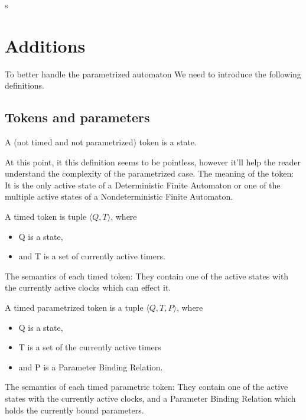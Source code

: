 s\chapter{Additions}
\label{chap:additions}


To better handle the parametrized automaton We need to introduce the following definitions.

\section{Tokens and parameters}

\begin{dfn}
	\label{token}
	A (not timed and not parametrized) token is a state.
\end{dfn}

At this point, it this definition seems to be pointless, however it'll help the reader understand the complexity of the parametrized case.
The meaning of the token: It is the only active state of a Deterministic Finite Automaton or one of the multiple active states of a Nondeterministic Finite Automaton.

\begin{dfn}
	\label{timed_token}
	A timed token is tuple $\langle Q, T\rangle$, where
	\begin{itemize}
		\item Q is a state,
		\item and T is a set of currently active timers.
	\end{itemize} 
\end{dfn}

The semantics of each timed token: They contain one of the active states with the currently active clocks which can effect it.

\begin{dfn}
	\label{timed_parametrized_token}
	A timed parametrized token is a tuple $\langle Q, T, P \rangle$, where
	\begin{itemize}
		\item Q is a state,
		\item T is a set of the currently active timers
		\item and P is a Parameter Binding Relation.
	\end{itemize}
\end{dfn}
 
The semantics of each timed parametric token: They contain one of the active states with the currently active clocks, and a Parameter Binding Relation which holds the currently bound parameters.

